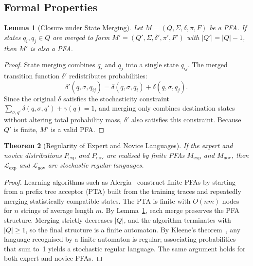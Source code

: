 \documentclass[sigconf]{acmart}
\theoremstyle{plain}
\newtheorem{theorem}{Theorem}
\newtheorem{lemma}[theorem]{Lemma}
\theoremstyle{definition}
\begin{document}
\subsection{Formal Properties}

\begin{lemma}[Closure under State Merging]
\label{lem:closure}
Let $M = (Q, \Sigma, \delta, \pi, F)$ be a PFA.
If states $q_i, q_j \in Q$ are merged to form $M' = (Q', \Sigma, \delta', \pi', F')$ with $|Q'| = |Q| - 1$, then $M'$ is also a PFA.
\end{lemma}

\begin{proof}
State merging combines $q_i$ and $q_j$ into a single state $q_{ij}$.
The merged transition function $\delta'$ redistributes probabilities:
\[
\delta'(q, \sigma, q_{ij}) = \delta(q, \sigma, q_i) + \delta(q, \sigma, q_j).
\]
Since the original $\delta$ satisfies the stochasticity constraint
$\sum_{\sigma,q'} \delta(q, \sigma, q') + \gamma(q) = 1$, and merging only combines destination states without altering total probability mass, $\delta'$ also satisfies this constraint.
Because $Q'$ is finite, $M'$ is a valid PFA.
\end{proof}

\begin{theorem}[Regularity of Expert and Novice Languages]
\label{thm:regularity}
If the expert and novice distributions $P_{\text{exp}}$ and $P_{\text{nov}}$ are realised by finite PFAs $M_{\text{exp}}$ and $M_{\text{nov}}$, then $\mathcal{L}_{\text{exp}}$ and $\mathcal{L}_{\text{nov}}$ are stochastic regular languages.
\end{theorem}

\begin{proof}
Learning algorithms such as Alergia~\cite{carrasco1994} construct finite PFAs by starting from a prefix tree acceptor (PTA) built from the training traces and repeatedly merging statistically compatible states.
The PTA is finite with $O(nm)$ nodes for $n$ strings of average length $m$.
By Lemma~\ref{lem:closure}, each merge preserves the PFA structure.
Merging strictly decreases $|Q|$, and the algorithm terminates with $|Q| \geq 1$, so the final structure is a finite automaton.
By Kleene's theorem~\cite{hopcroft2001,sipser2012}, any language recognised by a finite automaton is regular; associating probabilities that sum to~1 yields a stochastic regular language.
The same argument holds for both expert and novice PFAs.
\end{proof}
\end{document}
